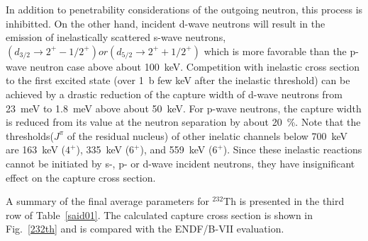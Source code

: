 \documentclass[twocolumn,amsmath,amssymb,10pt,groupedaddress,a4paper]{revtex4}
\begin{document}
In addition to penetrability considerations of the outgoing neutron, this process is inhibitted. On the other hand, incident d-wave neutrons will result in the emission of inelastically scattered s-wave neutrons, $(d_{3/2}\rightarrow 2^{+} - 1/2^+) or (d_{5/2}\rightarrow 2^{+} +1/2^+ )$ which is more favorable than the p-wave neutron case above about  100~keV. Competition with  inelastic  cross section to the first excited state (over 1~b few keV after the inelastic threshold) can be achieved by a drastic reduction of the capture width of d-wave neutrons from 23~meV to 1.8~meV above about 50~keV. For p-wave neutrons, the capture width is reduced from its value at the neutron separation by about 20~\%. Note that the thresholds($J^\pi$ of the residual nucleus) of other inelatic channels  below 700~keV are 163~keV ($4^+$), 335~keV ($6^+$), and 559~keV ($6^+$). Since these inelastic reactions cannot be initiated by s-, p- or d-wave incident neutrons, they have insignificant effect on the capture cross section.

A summary of the final average parameters for $^{232}$Th is presented in the third row of Table~\ref{said01}. The calculated capture cross section is shown in Fig.~\ref{232th} and is compared with the ENDF/B-VII evaluation.
\end{document}
